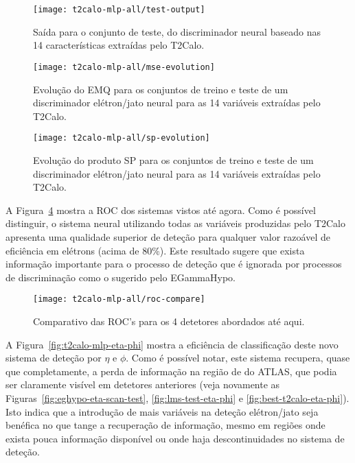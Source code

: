 \begin{figure}
\begin{center}
\texttt{[image: t2calo-mlp-all/test-output]}
\end{center}
\caption{Saída para o conjunto de teste, do discriminador neural baseado nas
14 características extraídas pelo T2Calo.}
\label{fig:t2calo-mlp-all-output}
\end{figure}

\begin{figure}
\begin{center}
\texttt{[image: t2calo-mlp-all/mse-evolution]}
\end{center}
\caption{Evolução do EMQ para os conjuntos de treino e teste de um
discriminador elétron/jato neural para as 14 variáveis extraídas pelo T2Calo.}
\label{fig:t2calo-mlp-all-mse-evo}
\end{figure}

\begin{figure}
\begin{center}
\texttt{[image: t2calo-mlp-all/sp-evolution]}
\end{center}
\caption{Evolução do produto SP para os conjuntos de treino e teste de um
discriminador elétron/jato neural para as 14 variáveis extraídas pelo T2Calo.}
\label{fig:t2calo-mlp-all-sp-evo}
\end{figure}

A Figura~\ref{fig:t2calo-mlp-all-roc-comp} mostra a ROC dos sistemas vistos
até agora. Como é possível distinguir, o sistema neural utilizando todas as
variáveis produzidas pelo T2Calo apresenta uma qualidade superior de deteção
para qualquer valor razoável de eficiência em elétrons (acima de 80\%). Este
resultado sugere que exista informação importante para o processo de deteção
que é ignorada por processos de discriminação como o sugerido pelo
EGammaHypo.  

\begin{figure}
\begin{center}
\texttt{[image: t2calo-mlp-all/roc-compare]}
\end{center}
\caption{Comparativo das ROC's para os 4 detetores abordados até aqui.}
\label{fig:t2calo-mlp-all-roc-comp}
\end{figure}

A Figura~\ref{fig:t2calo-mlp-eta-phi} mostra a eficiência de classificação
deste novo sistema de deteção por $\eta$ e $\phi$. Como é possível notar, este
sistema recupera, quase que completamente, a perda de informação na região de
 do ATLAS, que podia ser claramente visível em detetores
anteriores (veja novamente as Figuras~\ref{fig:eghypo-eta-scan-test},
\ref{fig:lms-test-eta-phi} e \ref{fig:best-t2calo-eta-phi}). Isto indica que
a introdução de mais variáveis na deteção elétron/jato seja benéfica no que
tange a recuperação de informação, mesmo em regiões onde exista pouca
informação disponível ou onde haja descontinuidades no sistema de deteção.

